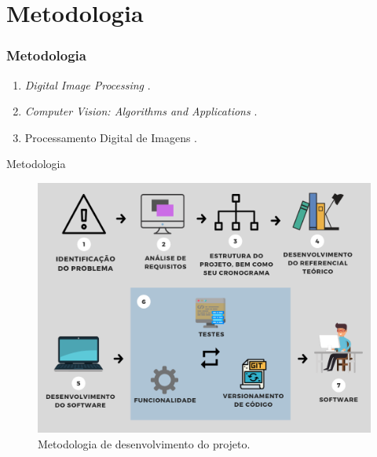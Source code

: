 \section{Metodologia}
\begin{frame}
\frametitle{Metodologia}
\label{metodologia}

\begin{enumerate}
    \item \textit{Digital Image Processing} \cite{GONZALEZ2002}.
    \item \textit{Computer Vision: Algorithms and Applications} \cite{SZELISKI2010}.
    \item Processamento Digital de Imagens \cite{FILHO1999}.
\end{enumerate}
\end{frame}

\begin{frame}{Metodologia}
\begin{figure}
    \centering
    \caption{\label{fig_metodologia-desenvolvimento-tcc}Metodologia de desenvolvimento do projeto.}
    \includegraphics[scale=0.3]{04-SLIDE_METODOLOGIA/metodologia-desenvolvimento-tcc.png}
\end{figure}
\end{frame}